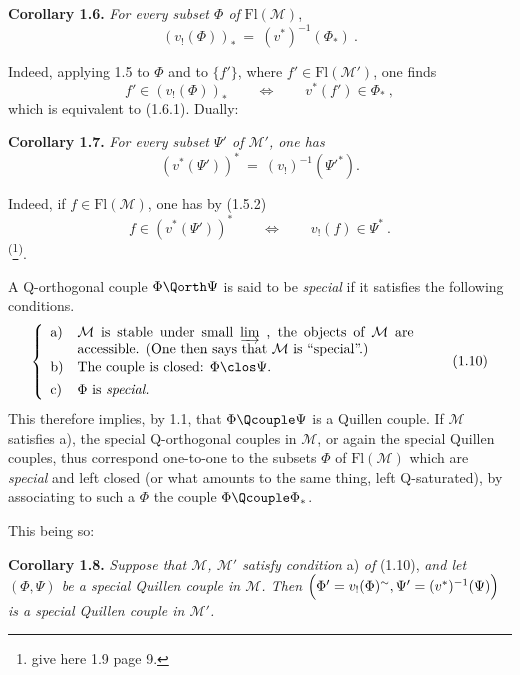 \textbf{Corollary 1.6.} \textit{For every subset $\Phi$ of} $\mathrm{Fl}(\mathcal{M})$,
\[
(v_{!}(\Phi))_{*} \ =\ (v^{*})^{-1}(\Phi_{*})\ . \tag*{(1.6.1)}
\]


Indeed, applying 1.5 to $\Phi$ and to $\{f'\}$, where $f' \in \mathrm{Fl}(\mathcal{M}')$, one finds
\[
f' \in (v_{!}(\Phi))_{*} \qquad \Longleftrightarrow \qquad v^{*}(f') \in \Phi_{*}\ ,
\]
which is equivalent to (1.6.1). Dually:

\textbf{Corollary 1.7.} \textit{For every subset $\Psi'$ of $\mathcal{M}'$, one has}
\[
(v^{*}(\Psi'))^{*} \ =\ (v_{!})^{-1}(\Psi'^{*}). \tag*{(1.7.1)}
\]

Indeed, if $f \in \mathrm{Fl}(\mathcal{M})$, one has by (1.5.2)
\[
f \in (v^{*}(\Psi'))^{*} \qquad \Longleftrightarrow \qquad v_{!}(f) \in \Psi^{*}\ . %
\]
\textsuperscript{(}\footnote[3]{give here 1.9 page 9.}\textsuperscript{)}.

A Q-orthogonal couple $\Phi \Qorth \Psi$ is said to be \textit{special} if it satisfies the following conditions.
\[
\left\{
\begin{array}{ll}
\text{a)} & \parbox[t]{0.7\textwidth}{$\mathcal{M}$ is stable under small $\varinjlim$ , the objects of $\mathcal{M}$ are accessible. (One then says that $\mathcal{M}$ is ``special''.)} \\[3ex]
\text{b)} & \text{The couple is closed: } \Phi \clos \Psi. \\[1ex]
\text{c)} & \Phi \text{ is \textit{special.}}
\end{array}
\right.
\tag*{(1.10)}
\]
This therefore implies, by 1.1, that $\Phi \Qcouple \Psi$ is a Quillen couple. If $\mathcal{M}$ satisfies a), the special Q-orthogonal couples in $\mathcal{M}$, or again the special Quillen couples, thus correspond one-to-one to the subsets $\Phi$ of $\mathrm{Fl}(\mathcal{M})$ which are \textit{special} and left closed (or what amounts to the same thing, left Q-saturated), by associating to such a $\Phi$ the couple $\Phi \Qcouple \Phi_{*}$.

This being so:

\marginpar{$\Vert$}%
\textbf{Corollary 1.8.} \textit{Suppose that $\mathcal{M}$, $\mathcal{M}'$ satisfy condition} a) \textit{of} (1.10), \textit{and let $(\Phi, \Psi)$ be a special Quillen couple in $\mathcal{M}$. Then $\Bigl(\Phi' = v_{!}(\Phi)^{\sim}, \Psi' = (v^{*})^{-1}(\Psi)\Bigr)$ is a special Quillen couple in $\mathcal{M}'$.}

